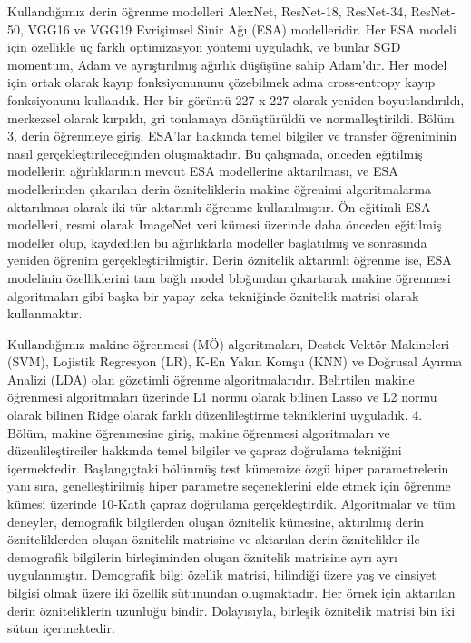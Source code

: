 Kullandığımız derin öğrenme modelleri AlexNet, ResNet-18, ResNet-34, ResNet-50, VGG16 ve VGG19 Evrişimsel Sinir Ağı (ESA) modelleridir. Her ESA modeli için özellikle üç farklı optimizasyon yöntemi uyguladık, ve bunlar SGD momentum, Adam ve ayrıştırılmış ağırlık düşüşüne sahip Adam'dır. Her model için ortak olarak kayıp fonksiyonununu çözebilmek adına cross-entropy kayıp fonksiyonunu kullandık. Her bir görüntü 227 x 227 olarak yeniden boyutlandırıldı, merkezsel olarak kırpıldı, gri tonlamaya dönüştürüldü ve normalleştirildi. Bölüm 3, derin öğrenmeye giriş, ESA'lar hakkında temel bilgiler ve transfer öğreniminin nasıl gerçekleştirileceğinden oluşmaktadır. Bu çalışmada, önceden eğitilmiş modellerin ağırlıklarının mevcut ESA modellerine aktarılması, ve ESA modellerinden çıkarılan derin özniteliklerin makine öğrenimi algoritmalarına aktarılması olarak iki tür aktarımlı öğrenme kullanılmıştır. Ön-eğitimli ESA modelleri, resmi olarak ImageNet veri kümesi üzerinde daha önceden eğitilmiş modeller olup, kaydedilen bu ağırlıklarla modeller başlatılmış ve sonrasında yeniden öğrenim gerçekleştirilmiştir. Derin öznitelik aktarımlı öğrenme ise, ESA modelinin özelliklerini tam bağlı model bloğundan çıkartarak makine öğrenmesi algoritmaları gibi başka bir yapay zeka tekniğinde öznitelik matrisi olarak kullanmaktır.

Kullandığımız makine öğrenmesi (MÖ) algoritmaları, Destek Vektör Makineleri (SVM), Lojistik Regresyon (LR), K-En Yakın Komşu (KNN) ve Doğrusal Ayırma Analizi (LDA) olan gözetimli öğrenme algoritmalarıdır. Belirtilen makine öğrenmesi algoritmaları üzerinde L1 normu olarak bilinen Lasso ve L2 normu olarak bilinen Ridge olarak farklı düzenlileştirme tekniklerini uyguladık. 4. Bölüm, makine öğrenmesine giriş, makine öğrenmesi algoritmaları ve düzenlileştirciler hakkında temel bilgiler ve çapraz doğrulama tekniğini içermektedir. Başlangıçtaki bölünmüş test kümemize özgü hiper parametrelerin yanı sıra, genelleştirilmiş hiper parametre seçeneklerini elde etmek için öğrenme kümesi üzerinde 10-Katlı çapraz doğrulama gerçekleştirdik. Algoritmalar ve tüm deneyler, demografik bilgilerden oluşan öznitelik kümesine, aktırılmış derin özniteliklerden oluşan öznitelik matrisine ve aktarılan derin öznitelikler ile demografik bilgilerin birleşiminden oluşan öznitelik matrisine ayrı ayrı uygulanmıştır. Demografik bilgi özellik matrisi, bilindiği üzere yaş ve cinsiyet bilgisi olmak üzere iki özellik sütunundan oluşmaktadır. Her örnek için aktarılan derin özniteliklerin uzunluğu bindir. Dolayısıyla, birleşik öznitelik matrisi bin iki sütun içermektedir.

